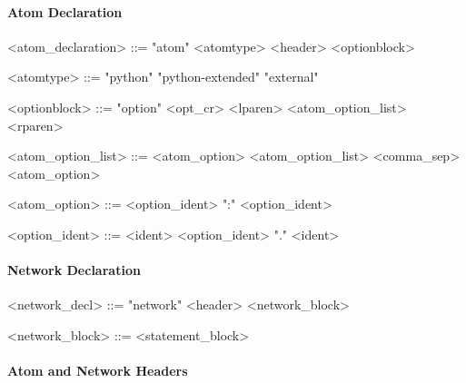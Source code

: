 \paragraph{Atom Declaration}

\begin{grammar}
  <atom_declaration> ::= "atom" <atomtype> <header> <optionblock>

  <atomtype> ::= "python"
  \alt "python-extended"
  \alt "external"

  <optionblock> ::= "option" <opt_cr> <lparen> <atom_option_list> <rparen>

  <atom_option_list> ::= <atom_option>
  \alt <atom_option_list> <comma_sep> <atom_option>

  <atom_option> ::= <option_ident> ":" <option_ident>

  <option_ident> ::= <ident>
  \alt <option_ident> "." <ident>
\end{grammar}


\paragraph{Network Declaration}

\begin{grammar}
  <network_decl> ::= "network" <header> <network_block>

  <network_block> ::= <statement_block>
\end{grammar}


\paragraph{Atom and Network Headers}

